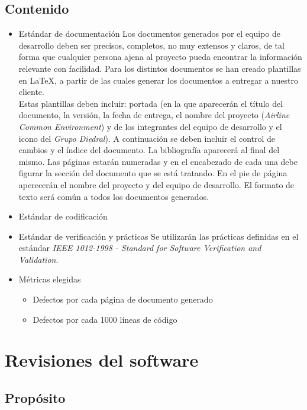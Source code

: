 \documentclass[11pt, a4paper, twoside, titlepage]{article}
\begin{document}
		\subsection{Contenido}
			\begin{itemize}
				\item Estándar de documentación
					Los documentos generados por el equipo de desarrollo deben ser precisos, completos, no muy extensos y claros, de tal forma que cualquier persona ajena al proyecto pueda encontrar la información relevante con facilidad.
Para los distintos documentos se han creado plantillas en {\rmfamily\LaTeX{}}, a partir de las cuales generar los documentos a entregar a nuestro cliente. \\
					Estas plantillas deben incluir: portada (en la que aparecerán el título del documento, la versión, la fecha de entrega, el nombre del proyecto (\textit{Airline Common Environment}) y de los integrantes del equipo de desarrollo y el icono del \textit{Grupo Diedral}). A continuación se deben incluir el control de cambios y el índice del documento. La bibliografía aparecerá al final del mismo. Las páginas estarán numeradas y en el encabezado de cada una debe figurar la sección del documento que se está tratando. En el pie de página aperecerán el nombre del proyecto y del equipo de desarrollo. El formato de texto será común a todos los documentos generados.

				\item Estándar de  codificación %
					

				\item Estándar de verificación y prácticas
					Se utilizarán las prácticas definidas en el estándar \textit{IEEE 1012-1998 - Standard for Software Verification and Validation}.

				\item Métricas elegidas
					\begin{itemize}
						\item Defectos por cada página de documento generado
						\item Defectos por cada 1000 líneas de código
					\end{itemize}
			\end{itemize}			
	\section{Revisiones del software}%
		\subsection{Propósito}
\end{document}
